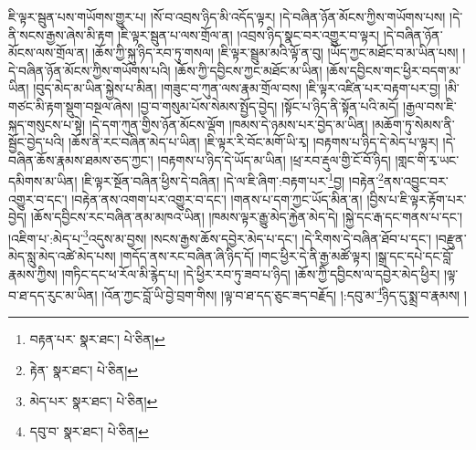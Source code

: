 ཇི་ལྟར་སྦུན་པས་གཡོགས་གྱུར་པ། །སོ་བ་འབྲས་ཉིད་མི་འདོད་ལྟར། །དེ་བཞིན་ཉོན་མོངས་ཀྱིས་གཡོགས་པས། །དེ་ནི་སངས་རྒྱས་ཞེས་མི་རྟག །ཇི་ལྟར་སྦུན་པ་ལས་གྲོལ་ན། །འབྲས་ཉིད་སྣང་བར་འགྱུར་བ་ལྟར། །དེ་བཞིན་ཉོན་མོངས་ལས་གྲོལ་ན། །ཆོས་ཀྱི་སྐུ་ཉིད་རབ་ཏུ་གསལ། །ཇི་ལྟར་སྦྲུམ་མའི་ལྟོ་ན་བུ། །ཡོད་ཀྱང་མཐོང་བ་མ་ཡིན་པས། །དེ་བཞིན་ཉོན་མོངས་ཀྱིས་གཡོགས་པའི། །ཆོས་ཀྱི་དབྱིངས་ཀྱང་མཐོང་མ་ཡིན། །ཆོས་དབྱིངས་གང་ཕྱིར་བདག་མ་ཡིན། །བུད་མེད་མ་ཡིན་སྐྱེས་པ་མིན། །གཟུང་བ་ཀུན་ལས་རྣམ་གྲོལ་བས། །ཇི་ལྟར་འཛིན་པར་བརྟག་པར་བྱ། །མི་གཙང་མི་རྟག་སྡུག་བསྔལ་ཞེས། །བྱ་བ་གསུམ་པོས་སེམས་སྤྱོད་བྱེད། །སྟོང་པ་ཉིད་ནི་སྟོན་པའི་མདོ། །རྒྱལ་བས་ཇི་སྐད་གསུངས་པ་སྟེ། །དེ་དག་ཀུན་གྱིས་ཉོན་མོངས་ལྡོག །ཁམས་དེ་ཉམས་པར་བྱེད་མ་ཡིན། །མཆོག་ཏུ་སེམས་ནི་སྦྱོང་བྱེད་པའི། །ཆོས་ནི་རང་བཞིན་མེད་པ་ཡིན། །ཇི་ལྟར་རི་བོང་མགོ་ཡི་རྭ། །བརྟགས་པ་ཉིད་དེ་མེད་པ་ལྟར། །དེ་བཞིན་ཆོས་རྣམས་ཐམས་ཅད་ཀྱང་། །བརྟགས་པ་ཉིད་དེ་ཡོད་མ་ཡིན། །ཕྲ་རབ་རྡུལ་གྱི་ངོ་བོ་ཉིད། །གླང་གི་རྭ་ཡང་དམིགས་མ་ཡིན། །ཇི་ལྟར་སྔོན་བཞིན་ཕྱིས་དེ་བཞིན། །དེ་ལ་ཇི་ཞིག་:བརྟག་པར་\footnote{བརྟན་པར་  སྣར་ཐང་།  པེ་ཅིན། }བྱ། །བརྟེན་\footnote{རྟེན་  སྣར་ཐང་།  པེ་ཅིན། }ནས་འབྱུང་བར་འགྱུར་བ་དང་། །བརྟེན་ནས་འགག་པར་འགྱུར་བ་དང་། །གནས་པ་དག་ཀྱང་ཡོད་མིན་ན། །བྱིས་པ་ཇི་ལྟར་རྟོག་པར་བྱེད། །ཆོས་དབྱིངས་རང་བཞིན་ནམ་མཁའ་ཡིན། །ཁམས་ལྟར་རྒྱུ་མེད་རྐྱེན་མེད་དེ། །སྐྱེ་དང་རྒ་དང་གནས་པ་དང་། །འཇིག་པ་:མེད་པ་\footnote{མེད་པར་  སྣར་ཐང་།  པེ་ཅིན། }འདུས་མ་བྱས། །སངས་རྒྱས་ཆོས་དབྱེར་མེད་པ་དང་། །དེ་རིགས་དེ་བཞིན་ཐོབ་པ་དང་། །བརྫུན་མེད་སླུ་མེད་འཚེ་མེད་པས། །གདོད་ནས་རང་བཞིན་ཞི་ཉིད་དོ། །གང་ཕྱིར་དེ་ནི་རྒྱ་མཚོ་ལྟར། །སྒྲ་དང་དཔེ་དང་བློ་རྣམས་ཀྱིས། །གཏིང་དང་ཕ་རོལ་མི་རྙེད་པ། །དེ་ཕྱིར་རབ་ཏུ་ཟབ་པ་ཉིད། །ཆོས་ཀྱི་དབྱིངས་ལ་དབྱེར་མེད་ཕྱིར། །ལྟ་བ་ཐ་དད་རུང་མ་ཡིན། །འོན་ཀྱང་བློ་ཡི་བྱེ་བྲག་གིས། །ལྟ་བ་ཐ་དད་ཅུང་ཟད་བརྗོད། །:དབུ་མ་\footnote{དབུ་བ་  སྣར་ཐང་།  པེ་ཅིན། }ཉིད་དུ་སྨྲ་བ་རྣམས། །
